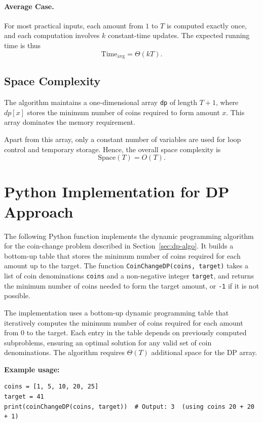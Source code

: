 \documentclass[12pt,a4paper]{report}
\begin{document}
\paragraph{Average Case.}
For most practical inputs, each amount from $1$ to $T$ is computed exactly once,
and each computation involves $k$ constant-time updates.
The expected running time is thus
\[
\text{Time}_{\text{avg}} = \Theta(kT).
\]

\subsection{Space Complexity}

The algorithm maintains a one-dimensional array \texttt{dp} of length $T + 1$,
where $dp[x]$ stores the minimum number of coins required to form amount $x$.
This array dominates the memory requirement.

Apart from this array, only a constant number of variables are used for loop control and temporary storage.
Hence, the overall space complexity is
\[
\text{Space}(T) = O(T).
\]


\section{Python Implementation for DP Approach}

The following Python function implements the dynamic programming algorithm for the coin-change problem described in Section~\ref{sec:dp-algo}.
It builds a bottom-up table that stores the minimum number of coins required for each amount up to the target.
The function \texttt{CoinChangeDP(coins, target)} takes a list of coin denominations \texttt{coins} and a non-negative integer \texttt{target}, and returns the minimum number of coins needed to form the target amount, or \texttt{-1} if it is not possible.




The implementation uses a bottom-up dynamic programming table that iteratively computes the minimum number of coins required for each amount from \(0\) to the target.
Each entry in the table depends on previously computed subproblems, ensuring an optimal solution for any valid set of coin denominations.
The algorithm requires \(\Theta(T)\) additional space for the DP array.

\textbf{Example usage:}
\begin{verbatim}
coins = [1, 5, 10, 20, 25]
target = 41
print(coinChangeDP(coins, target))  # Output: 3  (using coins 20 + 20 + 1)
\end{verbatim}
\end{document}
